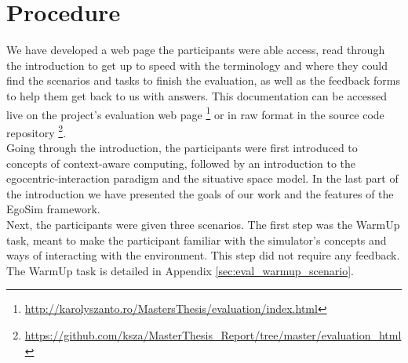 \section{Procedure} %
\label{sec:eval_procedure}
We have developed a web page the participants were able access, read through the introduction to get up to speed with the terminology and where they could find the scenarios and tasks to finish the evaluation, as well as the feedback forms to help them get back to us with answers. This documentation can be accessed live on the project's evaluation web page \footnote{\url{http://karolyszanto.ro/MastersThesis/evaluation/index.html}} or in raw format in the source code repository \footnote{\url{https://github.com/ksza/MasterThesis_Report/tree/master/evaluation_html}}.\\

Going through the introduction, the participants were first introduced to concepts of context-aware computing, followed by an introduction to the egocentric-interaction paradigm and the situative space model. In the last part of the introduction we have presented the goals of our work and the features of the EgoSim framework.\\

Next, the participants were given three scenarios. The first step was the WarmUp task, meant to make the participant familiar with the simulator's concepts and ways of interacting with the environment. This step did not require any feedback. The WarmUp task is detailed in Appendix \ref{sec:eval_warmup_scenario}.\\



